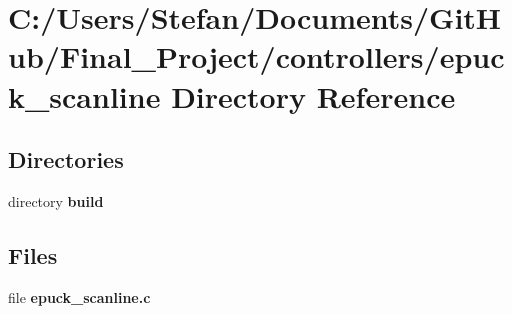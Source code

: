 \section{C\-:/\-Users/\-Stefan/\-Documents/\-Git\-Hub/\-Final\-\_\-\-Project/controllers/epuck\-\_\-scanline Directory Reference}
\label{dir_570285ef3c071404933da5c1ae4ad9c4}
\subsection*{Directories}
\begin{DoxyCompactItemize}
\item 
directory {\bf build}
\end{DoxyCompactItemize}
\subsection*{Files}
\begin{DoxyCompactItemize}
\item 
file {\bf epuck\-\_\-scanline.\-c}
\end{DoxyCompactItemize}
